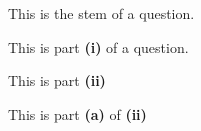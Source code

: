 

\begin{question}
    This is the stem of a question.

    \begin{questionparts}
        \item This is part \textbf{(i)} of a question.
        \item This is part \textbf{(ii)}
        \begin{questionsubparts}
            \item This is part \textbf{(a)} of \textbf{(ii)}
        \end{questionsubparts}
    \end{questionparts}

\end{question}



